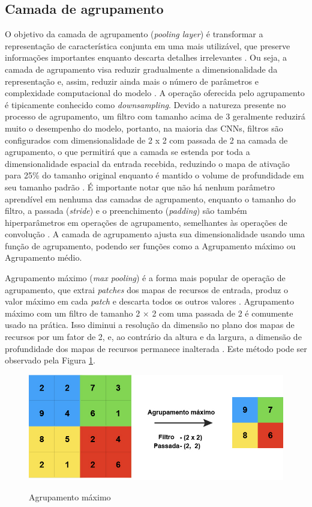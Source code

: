 \documentclass[
	12pt,				%
	oneside,			%
	a4paper,			%
	english,			%
	brazil				%
	]{abntex2ppgsi}
\begin{document}
\subsection{Camada de agrupamento}
O objetivo da camada de agrupamento (\textit{pooling layer}) é transformar a representação de característica conjunta em uma mais utilizável, que preserve informações importantes enquanto descarta detalhes irrelevantes \cite{yu2014mixed}. Ou seja, a camada de agrupamento visa reduzir gradualmente a dimensionalidade da representação e, assim, reduzir ainda mais o número de parâmetros e complexidade computacional do modelo \cite{o2015introduction}. A operação oferecida pelo agrupamento é tipicamente conhecido como \textit{downsampling}. Devido a natureza presente no processo de agrupamento, um filtro com tamanho acima de 3 geralmente reduzirá muito o desempenho do modelo, portanto, na maioria das CNNs, filtros são configurados com dimensionalidade de 2 x 2 com passada de 2 na camada de agrupamento, o que permitirá que a camada se estenda por toda a dimensionalidade espacial da entrada recebida, reduzindo o mapa de ativação para 25\% do tamanho original enquanto é mantido o volume de profundidade em seu tamanho padrão \cite{yamashita2018convolutional}. É importante notar que não há nenhum parâmetro aprendível em nenhuma das camadas de agrupamento, enquanto o tamanho do filtro, a passada (\textit{stride}) e o preenchimento (\textit{padding}) são também hiperparâmetros em operações de agrupamento, semelhantes às operações de convolução \cite{yamashita2018convolutional}. A camada de agrupamento ajusta sua dimensionalidade usando uma função de agrupamento, podendo ser funções como a Agrupamento máximo ou Agrupamento médio.

Agrupamento máximo (\textit{max pooling}) é a forma mais popular de operação de agrupamento, que extrai \textit{patches} dos mapas de recursos de entrada, produz o valor máximo em cada \textit{patch} e descarta todos os outros valores \cite{yamashita2018convolutional}. Agrupamento máximo com um filtro de tamanho 2 × 2 com uma passada de 2 é comumente usado na prática. Isso diminui a resolução da dimensão no plano dos mapas de recursos por um fator de 2, e, ao contrário da altura e da largura, a dimensão de profundidade dos mapas de recursos permanece inalterada \cite{yamashita2018convolutional}. Este método pode ser observado pela Figura \ref{fig:max_pooling}.

\begin{figure}[H]
    \centering
    \caption{Agrupamento máximo}
    \includegraphics[scale=.45]{imagens/conceitos_basicos/max_pooling.jpg}
    \label{fig:max_pooling}
\end{figure}
\end{document}
